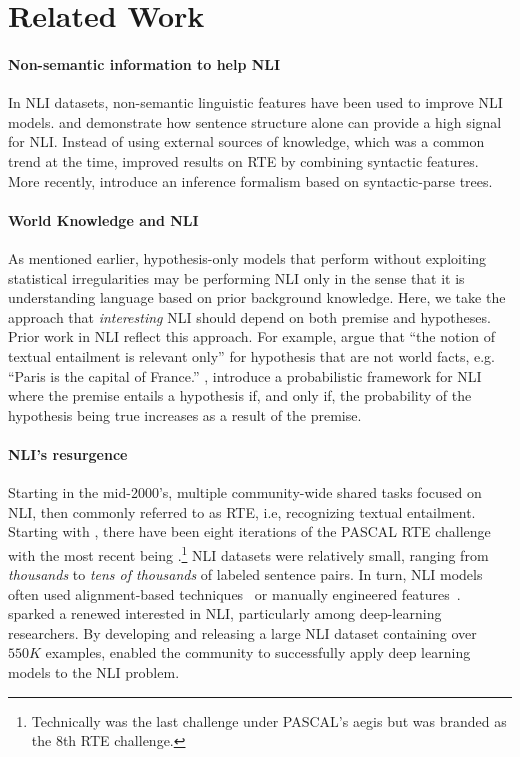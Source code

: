 \section{Related Work}

\paragraph{Non-semantic information to help NLI} In NLI datasets, non-semantic linguistic features have been used to improve NLI models.  and  demonstrate how sentence structure alone can provide a high signal for NLI. Instead of using external sources of knowledge, which was a common trend at the time,  improved results on RTE by combining syntactic features. More recently,
 introduce an inference formalism based on syntactic-parse trees.

\paragraph{World Knowledge and NLI} As mentioned earlier, hypothesis-only models that perform without exploiting statistical irregularities may be performing NLI only in the sense that it is understanding language based on prior background knowledge. Here, we take the approach that \textit{interesting} NLI should depend on both premise and hypotheses. Prior work in NLI reflect this approach. For example,  argue that ``the notion of textual entailment is relevant only'' for hypothesis that are not world facts, e.g. ``Paris is the capital of France.'' ,
introduce a probabilistic framework for NLI where the premise entails a hypothesis if, and only if, the probability of the hypothesis being true increases as a result of the premise.

\paragraph{NLI's resurgence} Starting in the mid-2000's, multiple community-wide shared tasks focused on NLI, then commonly referred to as RTE, i.e, recognizing textual entailment. Starting with , there have been eight iterations of the PASCAL RTE challenge with the most recent being .\footnote{Technically 
was the last challenge under PASCAL's aegis but  was branded as the $8$th RTE challenge.} NLI datasets were relatively small, ranging from 
\textit{thousands} 
to \textit{tens of thousands} of labeled sentence pairs. In turn, NLI models often used alignment-based techniques~\cite{maccartney2008phrase} or manually engineered features~\cite{androutsopoulos2010survey}.
 sparked a renewed interested in NLI, particularly among deep-learning researchers. By developing and releasing a large NLI dataset containing over $550K$ examples,  enabled the community to successfully apply deep learning models to the NLI problem. 


